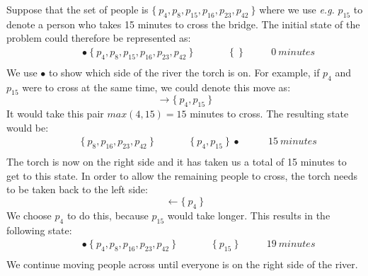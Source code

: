 \documentclass[10pt,a4paper,fleqn]{exam}
\begin{document}
\begin{questions}
Suppose that the set of people is $\{~p_4,p_8,p_{15},p_{16},p_{23},p_{42}~\}$ where we use \emph{e.g.} $p_{15}$ to denote a person who takes 15 minutes to cross the bridge. The initial state of the problem could therefore be represented as:
\begin{displaymath}
\begin{array}{llcll}
\qquad & \bullet~\{~p_4,p_8,p_{15},p_{16},p_{23},p_{42}~\} & \qquad & \{~~\} & \qquad 0~\mathit{minutes} \\
\end{array}
\end{displaymath}
We use $\bullet$ to show which side of the river the torch is on. For example, if $p_4$ and $p_{15}$ were to cross at the same time, we could denote this move as:
\begin{displaymath}
 \longrightarrow \{~p_4,p_{15}~\}
\end{displaymath}
It would take this pair $max(4,15) = 15$ minutes to cross. The resulting state would be:
\begin{displaymath}
\begin{array}{llcll}
\qquad & \{~p_8,p_{16},p_{23},p_{42}~\} & \qquad & \{~p_4,p_{15}~\}~\bullet & \qquad 15~\mathit{minutes} \\
\end{array}
\end{displaymath}
The torch is now on the right side and it has taken us a total of 15 minutes to get to this state. In order to allow the remaining people to cross, the torch needs to be taken back to the left side:
\begin{displaymath}
 \longleftarrow \{~p_4~\}
\end{displaymath}
We choose $p_4$ to do this, because $p_{15}$ would take longer. This results in the following state:
\begin{displaymath}
\begin{array}{llcll}
\qquad & \bullet~\{~p_4,p_8,p_{16},p_{23},p_{42}~\} & \qquad & \{~p_{15}~\} & \qquad 19~\mathit{minutes} \\
\end{array}
\end{displaymath}
We continue moving people across until everyone is on the right side of the river.
\begin{parts}

\end{parts}
\end{questions}
\end{document}
